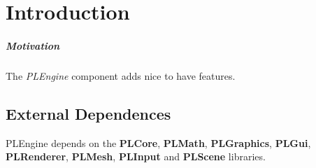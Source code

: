 \chapter{Introduction}


\paragraph{Motivation}
The \emph{PLEngine} component adds nice to have features.




\section{External Dependences}
PLEngine depends on the \textbf{PLCore}, \textbf{PLMath}, \textbf{PLGraphics}, \textbf{PLGui}, \textbf{PLRenderer}, \textbf{PLMesh}, \textbf{PLInput} and \textbf{PLScene} libraries.

